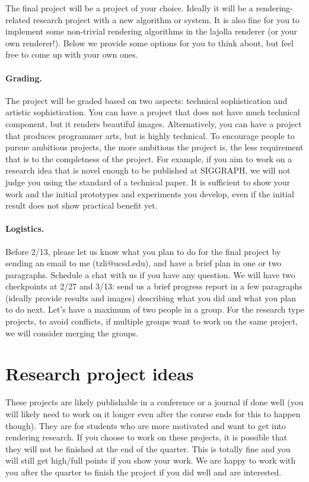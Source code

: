 




The final project will be a project of your choice. Ideally it will be a rendering-related research project with a new algorithm or system. It is also fine for you to implement some non-trivial rendering algorithms in the lajolla renderer (or your own renderer!).
Below we provide some options for you to think about, but feel free to come up with your own ones.

\paragraph{Grading.} 
The project will be graded based on two aspects: technical sophistication and artistic sophistication.
You can have a project that does not have much technical component, but it renders beautiful images.
Alternatively, you can have a project that produces programmer arts, but is highly technical. 
To encourage people to pursue ambitious projects, the more ambitious the project is, the less requirement that is to the completness of the project. 
For example, if you aim to work on a research idea that is novel enough to be published at SIGGRAPH, we will not judge you using the standard of a technical paper.
It is sufficient to show your work and the initial prototypes and experiments you develop, even if the initial result does not show practical benefit yet.

\paragraph{Logistics.}
Before 2/13, please let us know what you plan to do for the final project by sending an email to me (tzli@ucsd.edu), and have a brief plan in one or two paragraphs.
Schedule a chat with us if you have any question. 
We will have two checkpoints at 2/27 and 3/13: send us a brief progress report in a few paragraphs (ideally provide results and images) describing what you did and what you plan to do next.
Let's have a maximum of two people in a group. 
For the research type projects, to avoid conflicts, if multiple groups want to work on the same project, we will consider merging the groups. 

\section{Research project ideas}
These projects are likely publishable in a conference or a journal if done well (you will likely need to work on it longer even after the course ends for this to happen though).
They are for students who are more motivated and want to get into rendering research.
If you choose to work on these projects, it is possible that they will not be finished at the end of the quarter. This is totally fine and you will still get high/full points if you show your work.
We are happy to work with you after the quarter to finish the project if you did well and are interested.

